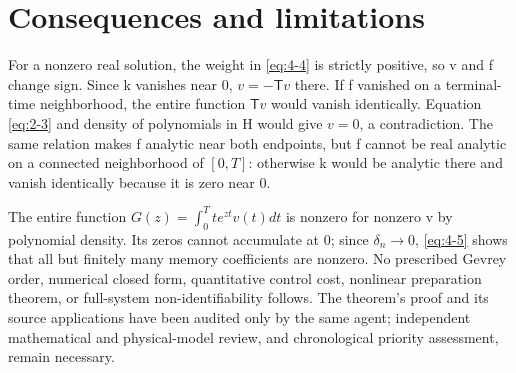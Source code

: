 \section{Consequences and limitations}\label{sec:consequences}
For a nonzero real solution, the weight in \eqref{eq:4-4} is strictly positive, so v and f change sign. Since k vanishes near 0, \(v=-\mathsf Tv\) there. If f vanished on a terminal-time neighborhood, the entire function \(\mathsf Tv\) would vanish identically. Equation \eqref{eq:2-3} and density of polynomials in H would give \(v=0\), a contradiction. The same relation makes f analytic near both endpoints, but f cannot be real analytic on a connected neighborhood of \([0,T]\): otherwise k would be analytic there and vanish identically because it is zero near 0.

The entire function \(G(z)=\int_0^T t e^{zt}v(t)dt\) is nonzero for nonzero v by polynomial density. Its zeros cannot accumulate at 0; since \(\delta_n\to0\), \eqref{eq:4-5} shows that all but finitely many memory coefficients are nonzero. No prescribed Gevrey order, numerical closed form, quantitative control cost, nonlinear preparation theorem, or full-system non-identifiability follows. The theorem's proof and its source applications have been audited only by the same agent; independent mathematical and physical-model review, and chronological priority assessment, remain necessary.
